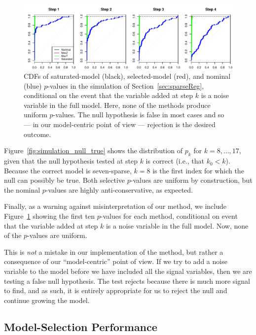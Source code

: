 \documentclass{article}
\begin{document}
\begin{figure}
  \centering
  \includegraphics[width=.8\textwidth]{figs/simulation_snr_5_alpha_05_noise_var.pdf}
  \caption{CDFs of saturated-model (black), selected-model (red), and nominal (blue) $p$-values in the simulation of Section~\ref{sec:sparseReg}, conditional on the event that the variable added at step $k$ is a noise variable in the full model. Here, none of the methods produce uniform $p$-values. The null hypothesis is false in most cases and so --- in our model-centric point of view --- rejection is the desired outcome.}
  \label{fig:simulation_noise_var}
\end{figure}


Figure~\ref{fig:simulation_null_true} shows the distribution of $p_k$ for $k = 8, \ldots, 17$, given that the null hypothesis tested at step $k$ is correct (i.e., that $k_0< k$). Because the correct model is seven-sparse, $k=8$ is the first index for which the null can possibly be true. Both selective $p$-values are uniform by construction, but the nominal $p$-values are highly anti-conservative, as expected.

Finally, as a warning against misinterpretation of our method, we include Figure~\ref{fig:simulation_noise_var} showing the first ten $p$-values for each method, conditional on event that the variable added at step $k$ is a noise variable in the full model. Now, none of the $p$-values are uniform. 

This is {\em not} a mistake in our implementation of the method, but rather a consequence of our ``model-centric'' point of view. If we try to add a noise variable to the model before we have included all the signal variables, then we are testing a false null hypothesis. The test rejects because there is much more signal to find, and as such, it is entirely appropriate for us to reject the null and continue growing the model.

\subsection{Model-Selection Performance}
\end{document}
